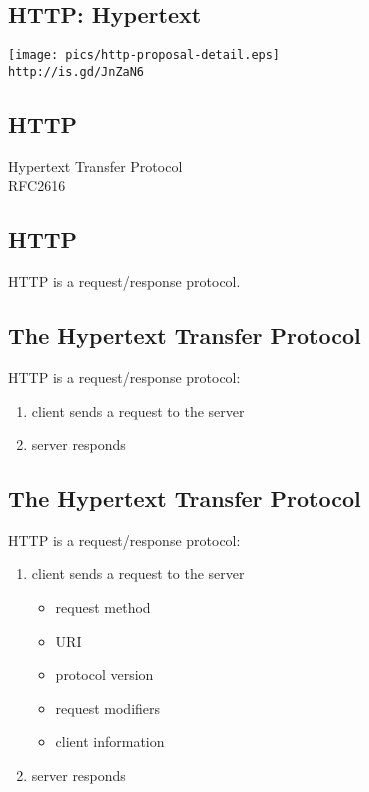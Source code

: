 \documentclass[xga]{xdvislides}
\begin{document}
\subsection{HTTP: Hypertext}
\begin{center}
	\texttt{[image: pics/http-proposal-detail.eps]} \\
	\vspace{.5in}
	\verb+http://is.gd/JnZaN6+
\end{center}

\subsection{HTTP}
\vspace{.5in}
\begin{center}
	\Huge
	Hypertext Transfer Protocol
	\\
	\vspace{.5in}
	RFC2616
\end{center}
\Normalsize

\subsection{HTTP}
\vspace{.5in}
\begin{center}
	\Huge
	HTTP is a request/response protocol.
\end{center}
\Normalsize

\subsection{The Hypertext Transfer Protocol}
HTTP is a request/response protocol:
\begin{enumerate}
	\item client sends a request to the server
	\item server responds
\end{enumerate}

\subsection{The Hypertext Transfer Protocol}
HTTP is a request/response protocol:
\begin{enumerate}
	\item client sends a request to the server
		\begin{itemize}
			\item request method
			\item URI
			\item protocol version
			\item request modifiers
			\item client information
		\end{itemize}
	\item server responds
\end{enumerate}
\end{document}
